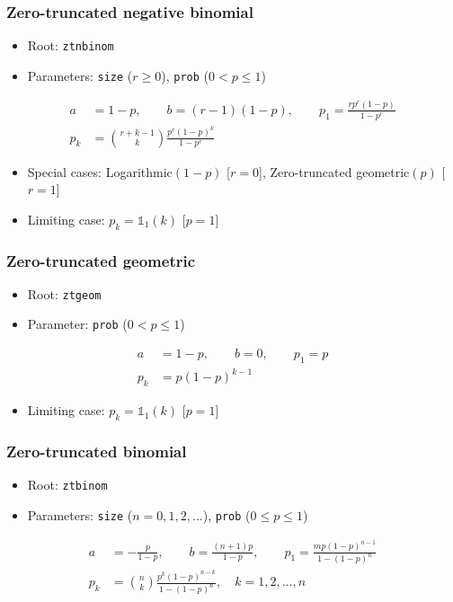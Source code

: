 \documentclass[x11names]{article}
\newcommand{\code}[1]{\texttt{#1}}
\begin{document}
\subsubsection{Zero-truncated negative binomial}

\begin{itemize}
\item Root: \code{ztnbinom}
\item Parameters: \code{size} ($r \geq 0$),
  \code{prob} ($0 < p \leq 1$)
\end{itemize}
\begin{align*}
  a &= 1 - p, \qquad b = (r - 1)(1 - p), \qquad
      p_1 = \frac{r p^r (1 - p)}{1 - p^r} \\
  p_k &= \binom{r+k-1}{k} \frac{p^r (1 - p)^k}{1 - p^r}
\end{align*}

\begin{itemize}
\item Special cases:  Logarithmic$(1 - p)$ [$r = 0$],
  Zero-truncated geometric$(p)$ [$r = 1$]
\item Limiting case: $p_k = \mathbb{1}_1(k)$ [$p = 1$]
\end{itemize}

\subsubsection{Zero-truncated geometric}

\begin{itemize}
\item Root: \code{ztgeom}
\item Parameter: \code{prob} ($0 < p \leq 1$)
\end{itemize}
\begin{align*}
  a &= 1 - p, \qquad b = 0, \qquad p_1 = p \\
  p_k &= p (1 - p)^{k - 1}
\end{align*}

\begin{itemize}
\item Limiting case: $p_k = \mathbb{1}_1(k)$ [$p = 1$]
\end{itemize}

\subsubsection{Zero-truncated binomial}

\begin{itemize}
\item Root: \code{ztbinom}
\item Parameters: \code{size} ($n = 0, 1, 2, \dots$),
  \code{prob} ($0 \leq p \leq 1$)
\end{itemize}
\begin{align*}
  a &= -\frac{p}{1 - p}, \qquad b = \frac{(n + 1)p}{1 - p}, \qquad
      p_1 = \frac{m p (1 - p)^{n - 1}}{1 - (1 - p)^n} \\
  p_k &= \binom{n}{k} \frac{p^k (1 - p)^{n - k}}{1 - (1 - p)^n}, \quad
        k = 1, 2, \dots, n
\end{align*}
\end{document}
